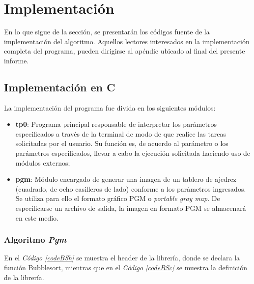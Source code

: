 \documentclass{article}
\newcommand{\refcode}[1]{\textit{Código \ref{#1}}}
\begin{document}
\section{Implementación}
	
	En lo que sigue de la sección, se presentarán los códigos fuente de la implementación del algoritmo. Aquellos lectores interesados en la implementación completa del programa, pueden dirigirse al apéndic ubicado al final del presente informe.



\subsection{Implementación en C}

	La implementación del programa fue divida en los siguientes módulos:
	\medskip

\begin{itemize}

\itemsep=2pt \topsep=0pt \partopsep=0pt \parskip=0pt \parsep=0pt
	\item \textbf{tp0}: Programa principal responsable de interpretar los parámetros especificados a través de la terminal de modo de que realice las tareas solicitadas por el usuario. Su función es, de acuerdo al parámetro o los parámetros especificados, llevar a cabo la ejecución solicitada haciendo uso de módulos externos;
	\item \textbf{pgm}: Módulo encargado de generar una imagen de un tablero de ajedrez (cuadrado, de ocho casilleros de lado) conforme a los parámetros ingresados. Se utiliza para ello el formato gráfico PGM o \textit{portable gray map}. De especificarse un archivo de salida, la imagen en formato PGM se almacenará en este medio.

\end{itemize}	
\medskip


\subsubsection{Algoritmo \textit{Pgm}}

	En el \refcode{codeBSh} se muestra el header de la librería, donde se declara la función Bubblesort, mientras que en el \refcode{codeBSc} se muestra la definición de la librería.

%  
\end{document}
